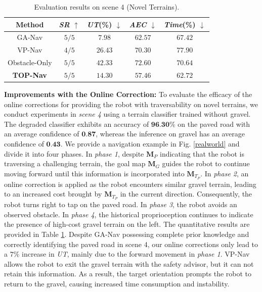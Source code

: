 \documentclass[conference]{IEEEtran}
\begin{document}
\begin{table}[t]
\small
\renewcommand{\arraystretch}{1.3}
\caption{Evaluation results on scene 4 (Novel Terrains).}
\begin{center}
\begin{tabular}{c|c c c c} 
\hline
\textbf{Method}&{\textit{SR}} $\uparrow$ &{\textit{UT}(\%)} $\downarrow$ &{\textit{AEC}} $\downarrow$ & {\textit{Time}(\%)} $\downarrow$ \\
\hline
GA-Nav& ${5/5}$& ${\bm{7.98}}$& ${62.57}$& ${67.42}$\\
VP-Nav            & ${4/5}$& ${26.43}$& ${70.30}$& ${77.90}$\\
Obstacle-Only& ${5/5}$& ${42.33}$& ${72.60}$& ${70.64}$\\
\textbf{TOP-Nav}  & ${5/5}$& ${14.30}$& ${\bm{57.46}}$& 
${\bm{62.72}} $\\
\hline
\end{tabular}
\label{Real World4}
\end{center}
\end{table}

\noindent\textbf{Improvements with the Online Correction:} To evaluate the efficacy of the online corrections for providing the robot with traversability on novel terrains, we conduct experiments in \textit{scene 4} using a terrain classifier trained without gravel. The degraded classifier exhibits an accuracy of $\textbf{96.30\%}$ on the paved road with an average confidence of $\textbf{0.87}$, whereas the inference on gravel has an average confidence of $\textbf{0.43}$. We provide a navigation example in Fig. \ref{realworld} and divide it into four phases. In \textit{phase 1}, despite ${\bm{M}_{P}}$ indicating that the robot is traversing a challenging terrain, the goal map ${\bm{M}_{G}}$ guides the robot to continue moving forward until this information is incorporated into ${\bm{M}_{T_P}}$. In \textit{phase 2}, an online correction is applied as the robot encounters similar gravel terrain, leading to an increased cost brought by ${\bm{M}_{T_P}}$ in the current direction. Consequently, the robot turns right to tap on the paved road. In \textit{phase 3}, the robot avoids an observed obstacle. In \textit{phase 4}, the historical proprioception continues to indicate the presence of high-cost gravel terrain on the left. The {quantitative} results are provided in Table \ref{Real World4}. Despite GA-Nav possessing complete prior knowledge and correctly identifying the paved road in scene 4, our online corrections only lead to a $7\%$ increase in \textit{UT}, mainly due to the forward movement in \textit{phase 1}. VP-Nav allows the robot to exit the gravel terrain with the safety advisor, but it can not retain this information. As a result, the target orientation prompts the robot to return to the gravel, causing increased time consumption and instability.
\end{document}
